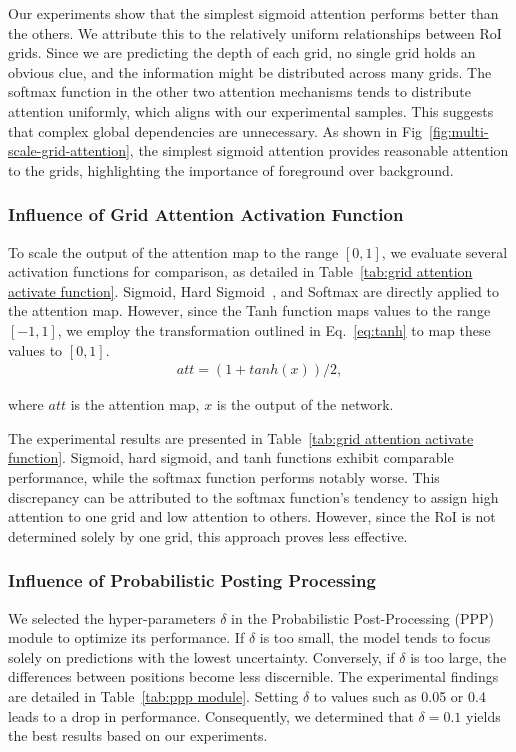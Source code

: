 \documentclass[journal]{IEEEtran}
\begin{document}
	Our experiments show that the simplest sigmoid attention performs better than the others. We attribute this to the relatively uniform relationships between RoI grids. Since we are predicting the depth of each grid, no single grid holds an obvious clue, and the information might be distributed across many grids. The softmax function in the other two attention mechanisms tends to distribute attention uniformly, which aligns with our experimental samples. This suggests that complex global dependencies are unnecessary. As shown in Fig~\ref{fig:multi-scale-grid-attention}, the simplest sigmoid attention provides reasonable attention to the grids, highlighting the importance of foreground over background.
	
	\subsubsection{Influence of Grid Attention Activation Function}
	To scale the output of the attention map to the range $[0, 1]$, we evaluate several activation functions for comparison, as detailed in Table~\ref{tab:grid attention activate function}. Sigmoid, Hard Sigmoid~\cite{hard-sigmoid}, and Softmax are directly applied to the attention map. However, since the Tanh function maps values to the range $[-1, 1]$, we employ the transformation outlined in Eq.~\eqref{eq:tanh} to map these values to $[0, 1]$.
	\begin{equation}
		\begin{aligned}
			att = (1+tanh(x))/2,
			\label{eq:tanh}
		\end{aligned}
	\end{equation}
	
	where $att$ is the attention map, $x$ is the output of the network.
	
	The experimental results are presented in Table~\ref{tab:grid attention activate function}. Sigmoid, hard sigmoid, and tanh functions exhibit comparable performance, while the softmax function performs notably worse. This discrepancy can be attributed to the softmax function's tendency to assign high attention to one grid and low attention to others. However, since the RoI is not determined solely by one grid, this approach proves less effective.
	
	\subsubsection{Influence of Probabilistic Posting Processing}
	We selected the hyper-parameters $\delta$ in the Probabilistic Post-Processing (PPP) module to optimize its performance. If $\delta$ is too small, the model tends to focus solely on predictions with the lowest uncertainty. Conversely, if $\delta$ is too large, the differences between positions become less discernible. The experimental findings are detailed in Table~\ref{tab:ppp module}. Setting $\delta$ to values such as 0.05 or 0.4 leads to a drop in performance. Consequently, we determined that $\delta=0.1$ yields the best results based on our experiments.
	
\end{document}
